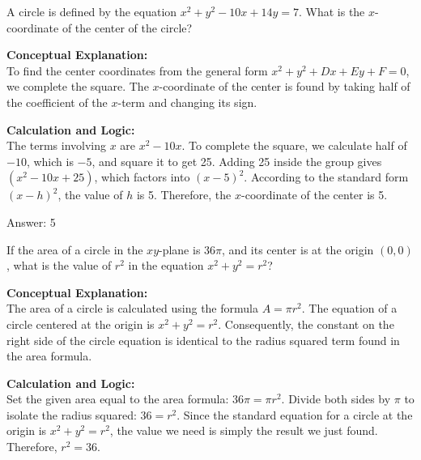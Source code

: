 \documentclass[11pt,paper=a4,answers]{exam}
\begin{document}
\begin{questions}
\vspace{60pt}

\question
A circle is defined by the equation $x^2 + y^2 - 10x + 14y = 7$. What is the $x$-coordinate of the center of the circle?

\begin{solution}
\textbf{Conceptual Explanation:} \\
To find the center coordinates from the general form $x^2 + y^2 + Dx + Ey + F = 0$, we complete the square. The $x$-coordinate of the center is found by taking half of the coefficient of the $x$-term and changing its sign.

\vspace{30pt}

\textbf{Calculation and Logic:} \\
The terms involving $x$ are $x^2 - 10x$. To complete the square, we calculate half of $-10$, which is $-5$, and square it to get 25. Adding 25 inside the group gives $(x^2 - 10x + 25)$, which factors into $(x - 5)^2$. According to the standard form $(x - h)^2$, the value of $h$ is 5. Therefore, the $x$-coordinate of the center is 5.

\vspace{30pt}

Answer: \colorbox{yellow!100}{5}
\end{solution}

\vspace{60pt}

\question
If the area of a circle in the $xy$-plane is $36\pi$, and its center is at the origin $(0, 0)$, what is the value of $r^2$ in the equation $x^2 + y^2 = r^2$?

\begin{solution}
\textbf{Conceptual Explanation:} \\
The area of a circle is calculated using the formula $A = \pi r^2$. The equation of a circle centered at the origin is $x^2 + y^2 = r^2$. Consequently, the constant on the right side of the circle equation is identical to the radius squared term found in the area formula.

\vspace{30pt}

\textbf{Calculation and Logic:} \\
Set the given area equal to the area formula: $36\pi = \pi r^2$. Divide both sides by $\pi$ to isolate the radius squared: $36 = r^2$. Since the standard equation for a circle at the origin is $x^2 + y^2 = r^2$, the value we need is simply the result we just found. Therefore, $r^2 = 36$.


\end{solution}
\end{questions}
\end{document}
